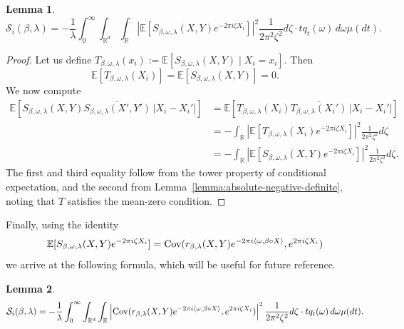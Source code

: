 \documentclass[sn-mathphys-num]{sn-jnl}%
\numberwithin{equation}{section}
\newcommand{\R}{\mathbb{R}}
\newcommand{\E}{\mathbb{E}}
\newtheorem{lemma}{Lemma}
\newcommand{\Cov}{{\rm Cov}}
\theoremstyle{thmstyleone}%
\theoremstyle{thmstyletwo}%
\theoremstyle{thmstylethree}%
\begin{document}
 \vspace{.5em} 
\begin{lemma}
\begin{equation*}
	\mathcal{S}_i (\beta, \lambda) =  -\frac{1}{\lambda} \int_0^\infty \int_{\R^d}
		\int_\R \left|\E[S_{\beta, \omega, \lambda} (X, Y) e^{-2\pi i \zeta X_i }] \right|^2 \frac{1}{2\pi^2 \zeta^2} d\zeta \cdot t q_t(\omega) \, d\omega  \mu(dt).
\end{equation*} 
\end{lemma} 
\begin{proof} 
Let us define
$
T_{\beta, \omega, \lambda}(x_i) := \E[S_{\beta, \omega, \lambda}(X, Y) \mid X_i = x_i]
$.
Then 
\[
	\E[T_{\beta, \omega, \lambda}(X_i)] = \E[S_{\beta, \omega, \lambda}(X, Y)] = 0.
\]
We now compute
\begin{equation*}
\begin{split} 
	\E\left[ S_{\beta, \omega, \lambda}(X, Y) \overline{S_{\beta, \omega, \lambda}(X', Y')}
\, |X_i - X_i'| \right] 
&= \E\left[ T_{\beta, \omega, \lambda}(X_i) \overline{T_{\beta, \omega, \lambda}(X_i')}
\, |X_i - X_i'| \right]  \\
&= -\int_\R \left|\E[T_{\beta, \omega, \lambda} (X_i) e^{-2\pi i \zeta X_i }] \right|^2 \frac{1}{2\pi^2 \zeta^2} d\zeta \\
&= -\int_\R \left|\E[S_{\beta, \omega, \lambda} (X, Y) e^{-2\pi i \zeta X_i }] \right|^2 \frac{1}{2\pi^2 \zeta^2} d\zeta.
\end{split} 
\end{equation*} 
The first and third equality follow from the tower property of conditional expectation, and the second from Lemma~\ref{lemma:absolute-negative-definite}, noting that $T$ satisfies the mean-zero condition.
\end{proof} 
Finally, using the identity
\begin{equation*}
	\E[S_{\beta, \omega, \lambda} (X, Y) e^{-2\pi i \zeta X_i }] = 
		\Cov(r_{\beta, \lambda} (X, Y) e^{-2\pi i \langle \omega, \beta \circ X\rangle},  e^{2\pi i \zeta X_i })
\end{equation*}
we arrive at the following formula, which will be useful for future reference. 
\begin{lemma}
\label{lemma:major-term}
\begin{equation*}
	\mathcal{S}_i (\beta, \lambda) =  -\frac{1}{\lambda} \int_0^\infty \int_{\R^d}
		\int_\R \left|\Cov(r_{\beta, \lambda} (X, Y) e^{-2\pi i \langle \omega, \beta \circ X\rangle},  e^{2\pi i \zeta X_i }) \right|^2 \frac{1}{2\pi^2 \zeta^2} d\zeta \cdot t q_t(\omega) \, d\omega  \mu(dt).
\end{equation*} 
\end{lemma}
\end{document}
